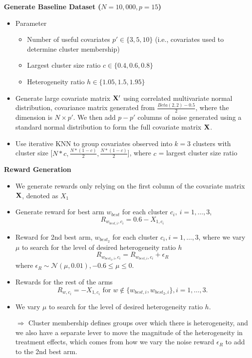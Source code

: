 \documentclass[letterpaper, 12pt, parskip=full,]{scrartcl}
\begin{document}
\textbf{Generate Baseline Dataset ($N = 10,000, p = 15$)}
\begin{itemize}
    \item Parameter \begin{itemize}
        \item Number of useful covariates $p' \in \{3, 5, 10\}$ (i.e., covariates used to determine cluster membership)
        \item Largest cluster size ratio $c \in \{0.4, 0.6, 0.8\}$
        \item Heterogeneity ratio $h \in \{1.05, 1.5, 1.95\}$
    \end{itemize}
    \item Generate large covariate matrix $\mathbf{X}'$ using correlated multivariate normal distribution, covariance matrix generated from $\frac{Beta(2,2) - 0.5}{2}$, where the dimension is $N \times p'$. We then add $p - p'$ columns of noise generated using a standard normal distribution to form the full covariate matrix $\mathbf{X}$.
    \item Use iterative KNN to group covariates observed into $k = 3$ clusters with cluster size [$N*c, \frac{N * (1-c)}{2}, \frac{N * (1-c)}{2}$], where $c$ = largest cluster size ratio
\end{itemize}

\textbf{Reward Generation}
\begin{itemize}
   \item We generate rewards only relying on the first column of the covariate matrix $\mathbf{X}$, denoted as $X_1$
    \item Generate reward for best arm $w_{best}$ for each cluster $c_i,  \ i = 1, \dots, 3$, \[R_{w_{best, i}, c_i} = 0.6 - X_{1, c_i}\]
    \item Reward for 2nd best arm, $w_{best_2}$ for each cluster $c_i,  i = 1, \dots, 3$, where we vary $\mu$ to search for the level of desired heterogeneity ratio $h$
    $$R_{w_{best_2, i}, c_i} = R_{w_{best, i}, c_i} + \epsilon_R $$ where $\epsilon_R \sim \mathcal{N}(\mu, 0.01), -0.6 \le \mu \le 0$. 
    \item Rewards for the rest of the arms
    $$R_{w, c_i} = -X_{1, c_i} \mbox{ for }  w \not\in \{w_{best, i}, w_{best_2, i}\}, i = 1, \dots, 3.$$
    \item We vary $\mu$ to search for the level of desired heterogeneity ratio $h$.
        \item[$\Rightarrow$] Cluster membership defines groups over which there is heterogeneity, and we also have a separate lever to move the magnitude of the heterogeneity in treatment effects, which comes from how we vary the noise reward $\epsilon_R$ to add to the 2nd best arm. 
\end{itemize}
\end{document}
